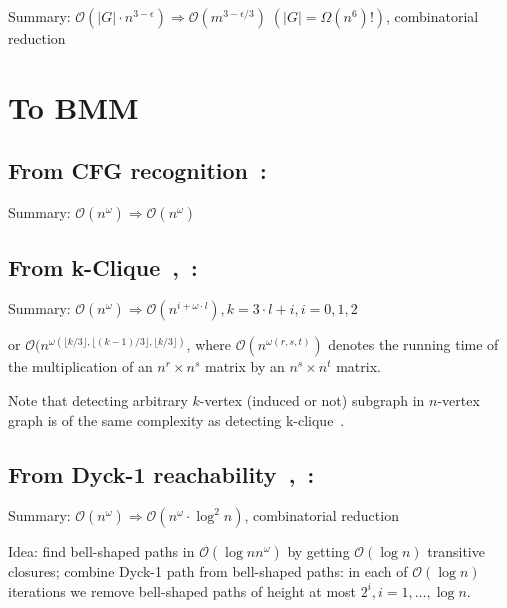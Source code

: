 \documentclass{amsart}
\begin{document}
	Summary: $\mathcal{O}(|G| \cdot n^{3 - \epsilon}) \Rightarrow \mathcal{O}(m^{3 - \epsilon/3}) \; (|G|=\Omega(n^6)!)$, combinatorial reduction
	
	\section{To BMM}
	
	\subsection{From CFG recognition~\cite{valiant1975general}:\\}
	\label{bmm_to_cfg}
	
	Summary: $\mathcal{O}(n^{\omega}) \Rightarrow \mathcal{O}(n^{\omega})$
	
	\subsection{From k-Clique~\cite{nevsetvril1985complexity},~\cite{10.1016/j.tcs.2004.05.009}:\\}
	\label{bmm_to_clique}
	
	Summary: $\mathcal{O}(n^{\omega}) \Rightarrow \mathcal{O}(n^{i + \omega \cdot l}), k = 3 \cdot l + i, i = 0, 1, 2$ 
	
	or $\mathcal{O}(n^{\omega(\lfloor k / 3 \rfloor, \lfloor (k - 1) / 3 \rfloor, \lfloor k / 3 \rfloor)}$, where $\mathcal{O}(n^{\omega(r, s, t)})$ denotes the running time of the multiplication of an $n^r \times n^s$ matrix by an $n^s \times n^t$ matrix.
	
	Note that detecting arbitrary $k$-vertex (induced or not) subgraph in $n$-vertex graph is of the same complexity as detecting k-clique~\cite{nevsetvril1985complexity}.
	
	\subsection{From Dyck-1 reachability~\cite{bradford2017efficient},~\cite{10.1145/3434315}:\\}
	\label{bmm_to_dyck1}
	
	Summary: $\mathcal{O}(n^{\omega}) \Rightarrow \mathcal{O}(n^{\omega} \cdot \log^2 n)$, combinatorial reduction~\cite{10.1145/3434315}
	
	Idea: find bell-shaped paths in $\mathcal{O}(\log n n^{\omega})$ by getting $\mathcal{O}(\log n)$ transitive closures; combine Dyck-1 path from bell-shaped paths: in each of $\mathcal{O}(\log n)$ iterations we remove bell-shaped paths of height at most $2^i, i = 1, \ldots, \log n$.
	
\end{document}
